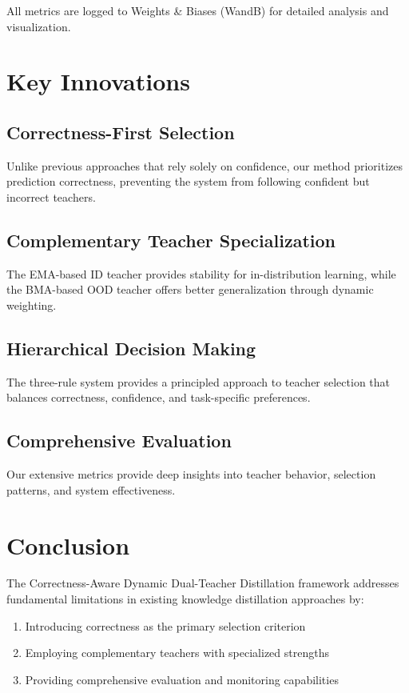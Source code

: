 \documentclass[11pt,a4paper]{article}
\begin{document}
All metrics are logged to Weights \& Biases (WandB) for detailed analysis and visualization.

\section{Key Innovations}

\subsection{Correctness-First Selection}
Unlike previous approaches that rely solely on confidence, our method prioritizes prediction correctness, preventing the system from following confident but incorrect teachers.

\subsection{Complementary Teacher Specialization}
The EMA-based ID teacher provides stability for in-distribution learning, while the BMA-based OOD teacher offers better generalization through dynamic weighting.

\subsection{Hierarchical Decision Making}
The three-rule system provides a principled approach to teacher selection that balances correctness, confidence, and task-specific preferences.

\subsection{Comprehensive Evaluation}
Our extensive metrics provide deep insights into teacher behavior, selection patterns, and system effectiveness.

\section{Conclusion}

The Correctness-Aware Dynamic Dual-Teacher Distillation framework addresses fundamental limitations in existing knowledge distillation approaches by:

\begin{enumerate}
\item Introducing correctness as the primary selection criterion
\item Employing complementary teachers with specialized strengths
\item Providing comprehensive evaluation and monitoring capabilities
\end{enumerate}
\end{document}
